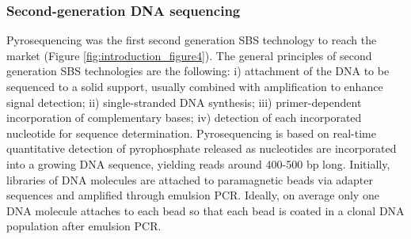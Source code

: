 \subsubsection{Second-generation DNA sequencing}

Pyrosequencing \cite{nyren_solid_1993, ronaghi_real-time_1996, margulies_genome_2005} was the first second generation \ac{SBS} technology to reach the market (Figure \ref{fig:introduction_figure4}). The general principles of second generation \ac{SBS} technologies are the following: i) attachment of the \ac{DNA} to be sequenced to a solid support, usually combined with amplification to enhance signal detection; ii) single-stranded \ac{DNA} synthesis; iii) primer-dependent incorporation of complementary bases; iv) detection of each incorporated nucleotide for sequence determination. Pyrosequencing is based on real-time quantitative detection of pyrophosphate released as nucleotides are incorporated into a growing \ac{DNA} sequence, yielding reads around 400-500 \ac{bp} long. Initially, libraries of \ac{DNA} molecules are attached to paramagnetic beads via adapter sequences and amplified through emulsion \ac{PCR}. Ideally, on average only one \ac{DNA} molecule attaches to each bead so that each bead is coated in a clonal \ac{DNA} population after emulsion \ac{PCR}.


